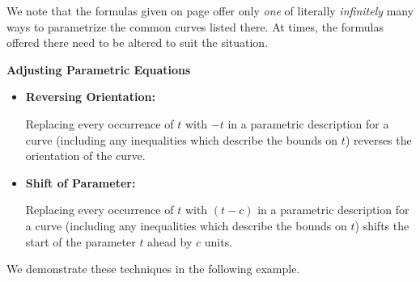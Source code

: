 \documentclass{ximera}
\begin{document}
We note that the formulas given on page \pageref{commonparametrizations} offer only \textit{one} of literally \textit{infinitely} many ways to parametrize the common curves listed there.  At times, the formulas offered there need to be altered to suit the situation.  

 


\centerline{\textbf{Adjusting Parametric Equations}}

\begin{itemize}

\item  \textbf{Reversing Orientation:}  $~$

Replacing every occurrence of $t$ with $-t$ in a parametric description for a curve (including any inequalities which describe the bounds on $t$) reverses the orientation of the curve.  

\item  \textbf{Shift of Parameter:}  $~$

Replacing every occurrence of $t$ with $(t-c)$ in a parametric description for a curve (including any inequalities which describe the bounds on $t$) shifts the start of the parameter $t$ ahead by $c$ units.

\end{itemize}

 


\medskip

We demonstrate these techniques in the following example.
\end{document}
